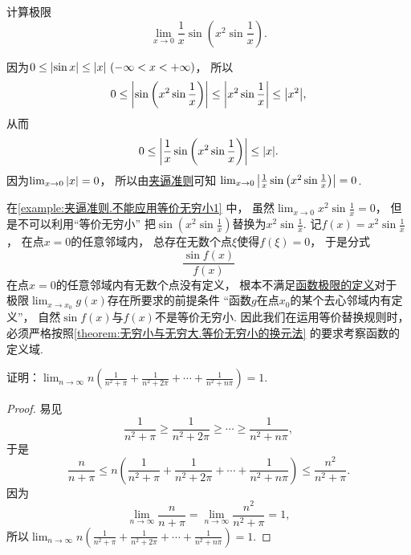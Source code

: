 \begin{example}\label{example:夹逼准则.不能应用等价无穷小1}
计算极限\begin{equation*}
	\lim_{x\to0} \frac1x \sin\left(x^2 \sin\frac1x\right).
\end{equation*}
\begin{solution}
因为\(0\leq\abs{\sin x}\leq\abs{x}\ (-\infty<x<+\infty)\)，
所以\begin{equation*}
	0 \leq \abs{\sin\left(x^2 \sin\frac1x\right)}
	\leq \abs{x^2 \sin\frac1x}
	\leq \abs{x^2},
\end{equation*}
从而\begin{equation*}
	0 \leq \abs{\frac1x \sin\left(x^2 \sin\frac1x\right)} \leq \abs{x}.
\end{equation*}
因为\(\lim_{x\to0} \abs{x} = 0\)，
所以由\hyperref[theorem:数列极限.夹逼准则]{夹逼准则}可知
\(\lim_{x\to0} \abs{\frac1x \sin\left(x^2 \sin\frac1x\right)} = 0\).
\end{solution}
\end{example}
\begin{remark}
在\cref{example:夹逼准则.不能应用等价无穷小1} 中，
虽然\(\lim_{x\to0} x^2 \sin\frac1x = 0\)，
但是不可以利用“等价无穷小”
把\(\sin\left(x^2 \sin\frac1x\right)\)替换为\(x^2 \sin\frac1x\).
记\(f(x) = x^2 \sin\frac1x\)，
在点\(x=0\)的任意邻域内，
总存在无数个点\(\xi\)使得\(f(\xi) = 0\)，
于是分式\begin{equation*}
	\frac{\sin f(x)}{f(x)}
\end{equation*}在点\(x=0\)的任意邻域内有无数个点没有定义，
根本不满足\hyperref[definition:极限.函数极限的定义1]{函数极限的定义}对于
极限\(\lim_{x \to x_0} g(x)\)存在所要求的前提条件
“函数\(g\)在点\(x_0\)的某个去心邻域内有定义”，
自然\(\sin f(x)\)与\(f(x)\)不是等价无穷小.
因此我们在运用等价替换规则时，
必须严格按照\cref{theorem:无穷小与无穷大.等价无穷小的换元法} 的要求考察函数的定义域.
\end{remark}

\begin{example}
证明：\(\lim_{n\to\infty} n \left(\frac1{n^2+\pi}+\frac1{n^2+2\pi}+\dotsb+\frac1{n^2+n\pi}\right)=1\).
\begin{proof}
易见\begin{equation*}
	\frac1{n^2+\pi}
	\geq \frac1{n^2+2\pi}
	\geq \dotsb
	\geq \frac1{n^2+n\pi},
\end{equation*}
于是\begin{equation*}
	\frac{n}{n+\pi}
	\leq
	n \left(\frac1{n^2+\pi}+\frac1{n^2+2\pi}+\dotsb+\frac1{n^2+n\pi}\right)
	\leq
	\frac{n^2}{n^2+\pi}.
\end{equation*}
因为\begin{equation*}
	\lim_{n\to\infty} \frac{n}{n+\pi}
	= \lim_{n\to\infty} \frac{n^2}{n^2+\pi}
	= 1,
\end{equation*}
所以\(\lim_{n\to\infty} n \left(\frac1{n^2+\pi}+\frac1{n^2+2\pi}+\dotsb+\frac1{n^2+n\pi}\right)=1\).
\end{proof}
\end{example}

